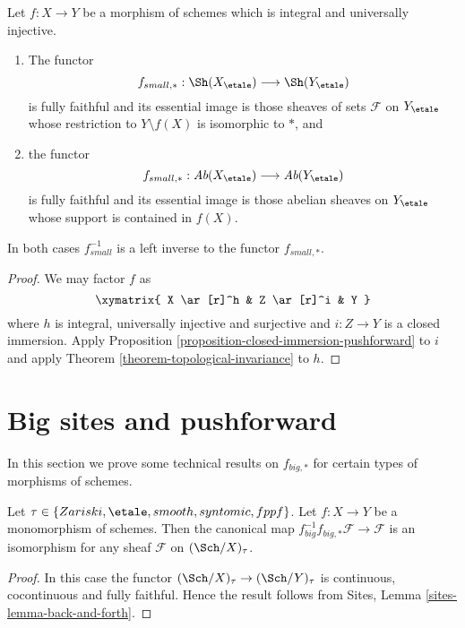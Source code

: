 \begin{proposition}
\label{proposition-integral-universally-injective-pushforward}
Let $f : X \to Y$ be a morphism of schemes which is integral
and universally injective.
\begin{enumerate}
\item The functor
$$
f_{small, *} :
\Sh(X_\etale)
\longrightarrow
\Sh(Y_\etale)
$$
is fully faithful and its essential image is those sheaves of sets
$\mathcal{F}$ on $Y_\etale$ whose restriction to $Y \setminus f(X)$ is
isomorphic to $*$, and
\item the functor
$$
f_{small, *} :
\textit{Ab}(X_\etale)
\longrightarrow
\textit{Ab}(Y_\etale)
$$
is fully faithful and its essential image is those abelian sheaves on
$Y_\etale$ whose support is contained in $f(X)$.
\end{enumerate}
In both cases $f_{small}^{-1}$ is a left inverse to the functor
$f_{small, *}$.
\end{proposition}

\begin{proof}
We may factor $f$ as
$$
\xymatrix{
X \ar[r]^h & Z \ar[r]^i & Y
}
$$
where $h$ is integral, universally injective and surjective
and $i : Z \to Y$ is a closed immersion.
Apply
Proposition \ref{proposition-closed-immersion-pushforward}
to $i$ and apply
Theorem \ref{theorem-topological-invariance}
to $h$.
\end{proof}









\section{Big sites and pushforward}
\label{section-big}

\noindent
In this section we prove some technical results on $f_{big, *}$ for
certain types of morphisms of schemes.

\begin{lemma}
\label{lemma-monomorphism-big-push-pull}
Let $\tau \in \{Zariski, \etale, smooth, syntomic, fppf\}$.
Let $f : X \to Y$ be a monomorphism of schemes.
Then the canonical map
$f_{big}^{-1}f_{big, *}\mathcal{F} \to \mathcal{F}$
is an isomorphism for any sheaf $\mathcal{F}$ on
$(\Sch/X)_\tau$.
\end{lemma}

\begin{proof}
In this case the functor $(\Sch/X)_\tau \to (\Sch/Y)_\tau$
is continuous, cocontinuous and fully faithful. Hence the result follows from
Sites, Lemma \ref{sites-lemma-back-and-forth}.
\end{proof}

